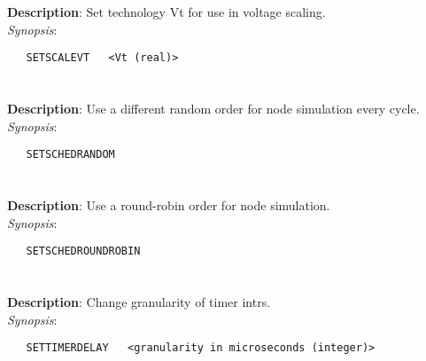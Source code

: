 \section{\quad{}}
\label{manpages:SETSCALEVT}
\label{manpages:setscalevt}
\vspace{-0.1in}
{\bf Description}: 	Set technology Vt for use in voltage scaling.\\[1.5ex]
{\em Synopsis}:
\vspace{-0.05in}
\scriptsize
\begin{lstlisting}
   SETSCALEVT   <Vt (real)>																		
\end{lstlisting}
\normalsize
\vspace{-0.05in}


\section{\quad{}}
\label{manpages:SETSCHEDRANDOM}
\label{manpages:setschedrandom}
\vspace{-0.1in}
{\bf Description}: 	Use a different random order for node simulation every cycle.\\[1.5ex]
{\em Synopsis}:
\vspace{-0.05in}
\scriptsize
\begin{lstlisting}
   SETSCHEDRANDOM   																	
\end{lstlisting}
\normalsize
\vspace{-0.05in}


\section{\quad{}}
\label{manpages:SETSCHEDROUNDROBIN}
\label{manpages:setschedroundrobin}
\vspace{-0.1in}
{\bf Description}: 	Use a round-robin order for node simulation.\\[1.5ex]
{\em Synopsis}:
\vspace{-0.05in}
\scriptsize
\begin{lstlisting}
   SETSCHEDROUNDROBIN   																			
\end{lstlisting}
\normalsize
\vspace{-0.05in}


\section{\quad{}}
\label{manpages:SETTIMERDELAY}
\label{manpages:settimerdelay}
\vspace{-0.1in}
{\bf Description}: 	Change granularity of timer intrs.\\[1.5ex]
{\em Synopsis}:
\vspace{-0.05in}
\scriptsize
\begin{lstlisting}
   SETTIMERDELAY   <granularity in microseconds (integer)>																
\end{lstlisting}
\normalsize
\vspace{-0.05in}


